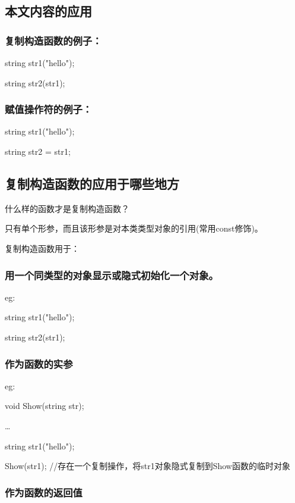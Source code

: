 \documentclass{article}
\begin{document}
\subsection{本文内容的应用}
\label{sec-5-1}
\subsubsection{复制构造函数的例子：}
\label{sec-5-1-1}

string str1("hello");

string str2(str1);

\subsubsection{赋值操作符的例子：}
\label{sec-5-1-2}

string str1("hello");

string str2 = str1;
\subsection{复制构造函数的应用于哪些地方}
\label{sec-5-2}

什么样的函数才是复制构造函数？

只有单个形参，而且该形参是对本类类型对象的引用(常用const修饰)。

复制构造函数用于：
\subsubsection{用一个同类型的对象显示或隐式初始化一个对象。}
\label{sec-5-2-1}

eg:

string str1("hello");

string str2(str1);

\subsubsection{作为函数的实参}
\label{sec-5-2-2}

eg:

void Show(string str);

\ldots{}

string str1("hello");

Show(str1); //存在一个复制操作，将str1对象隐式复制到Show函数的临时对象
\subsubsection{作为函数的返回值}
\label{sec-5-2-3}
\end{document}
